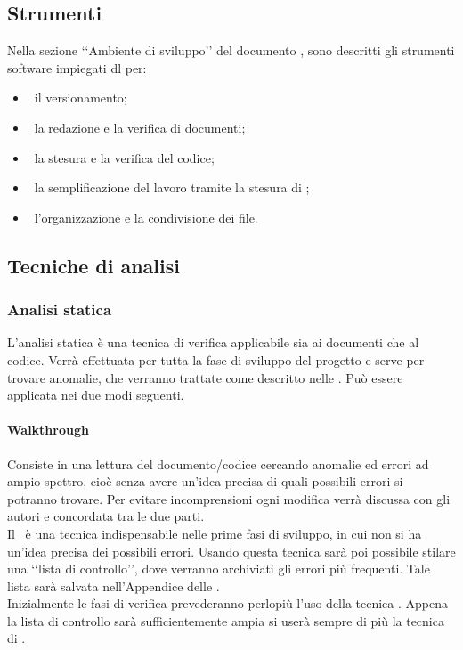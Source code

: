 	\subsection{Strumenti}
		Nella sezione ‘‘Ambiente di sviluppo’’ del documento \NPdoc, sono descritti gli strumenti software impiegati dl  per:
		\begin{itemize}
			\item\ il versionamento;
			\item\ la redazione e la verifica di documenti;
			\item\ la stesura e la verifica del codice;
			\item\ la semplificazione del lavoro tramite la stesura di ; %
			\item\ l'organizzazione e la condivisione dei file.
		\end{itemize}
	\subsection{Tecniche di analisi}
		\label{sec:TecnicheAnalisi} %
		\subsubsection{Analisi statica}
			L'analisi statica è una tecnica di verifica applicabile sia ai documenti che al codice. Verrà effettuata per tutta la fase di sviluppo del progetto e serve per trovare anomalie, che verranno trattate come descritto nelle \NPdoc. Può essere applicata nei due modi seguenti.
			\paragraph{Walkthrough}
				Consiste in una lettura del documento/codice cercando anomalie ed errori ad ampio spettro, cioè senza avere un'idea precisa di quali possibili errori si potranno trovare. Per evitare incomprensioni ogni modifica verrà discussa con gli autori e concordata tra le due parti. \\
				Il \ è una tecnica indispensabile nelle prime fasi di sviluppo, in cui non si ha un'idea precisa dei possibili errori. Usando questa tecnica sarà poi possibile stilare una ‘‘lista di controllo’’, dove verranno archiviati gli errori più frequenti. Tale lista sarà salvata nell'Appendice delle \NPdoc. \\ %
				Inizialmente le fasi di verifica prevederanno perlopiù l'uso della tecnica . Appena la lista di controllo sarà sufficientemente ampia si userà sempre di più la tecnica di .
